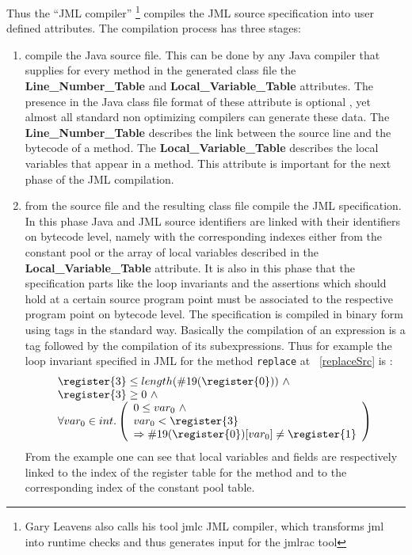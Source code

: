 Thus the ``JML compiler'' \footnote{Gary Leavens also calls his tool jmlc JML compiler, which transforms jml into runtime checks and thus generates input for the jmlrac tool  } compiles the JML source specification into user defined attributes. The compilation process has three stages:
\begin{enumerate}
\item compile the Java source file. This can be done by any Java compiler that supplies for every method in the generated class file the \textbf{Line\_Number\_Table} and \textbf{Local\_Variable\_Table}  attributes. The presence in the Java class file format of these attribute is optional \cite{VMSpec}, yet almost all standard non optimizing compilers can generate these data. The \textbf{Line\_Number\_Table} describes the link between the source line and the bytecode of a method.  The \textbf{Local\_Variable\_Table} describes the local variables that appear in a method. This attribute is important for the next phase of the JML compilation.
\item from the source file and the resulting class file compile the JML specification. In this phase Java and JML source identifiers are linked with their identifiers on bytecode level, namely with the corresponding indexes either from the constant pool or the array of local variables described in the \textbf{Local\_Variable\_Table} attribute. It is also in this phase that the specification parts like the loop invariants and the assertions which should hold at a certain source program point must be associated to the respective program point on bytecode level. The specification
is compiled in binary form using tags in the standard way. Basically the compilation of an expression is a tag followed by the compilation of its subexpressions. 
Thus for example the loop invariant specified in JML for the method \texttt{replace} at ~\ref{replaceSrc} is :
$$
\begin{array}{l}
\register{3} \le length(\#19(\register{0})) \ \wedge \\
\register{3} \ge 0  \ \wedge \\ 
       \forall  var_0 \in int . \left(\begin{array}{l} 0 \le var_0 \ \wedge \\ var_0 < \register{3}  \\
                \Rightarrow  \#19(\register{0})[var_0] \neq \register{1} \end{array} \right)
\end{array}
$$
From the example one can see that local variables and  fields are respectively linked to the index of the register table for the method and to the corresponding index of the constant pool table. 

\end{enumerate}

